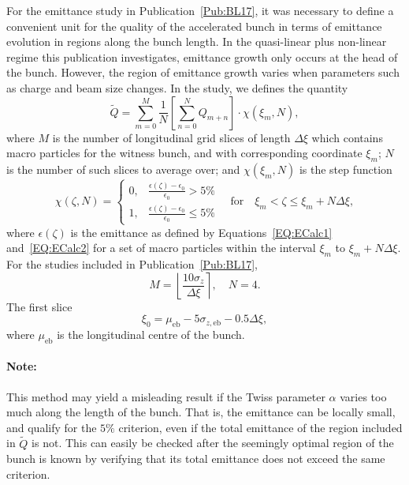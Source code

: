 For the emittance study in Publication~\ref{Pub:BL17}, it was necessary to define a convenient unit for the quality of the accelerated bunch in terms of emittance evolution in regions along the bunch length.
In the quasi-linear plus non-linear regime this publication investigates, emittance growth only occurs at the head of the bunch.
However, the region of emittance growth varies when parameters such as charge and beam size changes.
In the study, we defines the quantity
\begin{equation}
    \tilde{Q} = \sum_{m=0}^{M} \frac{1}{N} \left[\sum_{n=0}^{N} Q_{m+n}\right] \cdot \chi(\xi_{m},N),
\end{equation}
where $M$ is the number of longitudinal grid slices of length $\Delta\xi$ which contains macro particles for the witness bunch, and with corresponding coordinate $\xi_{m}$; $N$ is the number of such slices to average over; and $\chi(\xi_{m},N)$ is the step function
\begin{equation}
    \chi(\zeta,N) =
    \begin{cases}
        0, & \frac{\epsilon(\zeta) - \epsilon_{0}}{\epsilon_{0}} > 5\% \\
        1, & \frac{\epsilon(\zeta) - \epsilon_{0}}{\epsilon_{0}} \leq 5\%
    \end{cases}
    \quad\mathrm{for}\quad
    \xi_{m} < \zeta \leq \xi_{m} + N\Delta\xi,
\end{equation}
where $\epsilon(\zeta)$ is the emittance as defined by Equations~\ref{EQ:ECalc1} and~\ref{EQ:ECalc2} for a set of macro particles within the interval $\xi_{m}$ to $\xi_{m} + N\Delta\xi$.
For the studies included in Publication~\ref{Pub:BL17},
\begin{equation}
    M = \left\lfloor \frac{10\sigma_{z}}{\Delta\xi} \right\rceil, \quad
    N = 4.
\end{equation}
The first slice
\begin{equation}
    \xi_{0} = \mu_{\mathrm{eb}} - 5\sigma_{z,\mathrm{eb}} - 0.5\Delta\xi,
\end{equation}
where $\mu_{\mathrm{eb}}$ is the longitudinal centre of the bunch.

\paragraph{Note:} This method may yield a misleading result if the Twiss parameter $\alpha$ varies too much along the length of the bunch.
That is, the emittance can be locally small, and qualify for the $5\%$ criterion, even if the total emittance of the region included in $\tilde{Q}$ is not.
This can easily be checked after the seemingly optimal region of the bunch is known by verifying that its total emittance does not exceed the same criterion.

